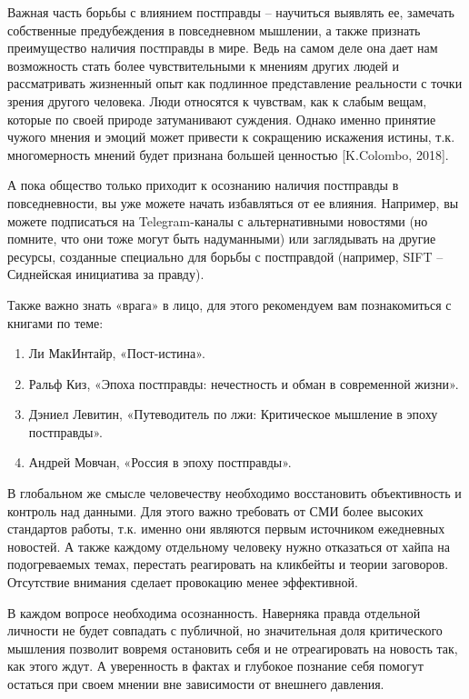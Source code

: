 Важная часть борьбы с влиянием постправды – научиться выявлять ее, замечать собственные предубеждения в повседневном мышлении, а также признать преимущество наличия постправды в мире. Ведь на самом деле она дает нам возможность стать более чувствительными к мнениям других людей и рассматривать жизненный опыт как подлинное представление реальности с точки зрения другого человека. Люди относятся к чувствам, как к слабым вещам, которые по своей природе затуманивают суждения. Однако именно принятие чужого мнения и эмоций может привести к сокращению искажения истины, т.к. многомерность мнений будет признана большей ценностью [K.Colombo, 2018].

А пока общество только приходит к осознанию наличия постправды в повседневности, вы уже можете начать избавляться от ее влияния. Например, вы можете подписаться на Telegram-каналы с альтернативными новостями (но помните, что они тоже могут быть надуманными) или заглядывать на другие ресурсы, созданные специально для борьбы с постправдой (например, SIFT – Сиднейская инициатива за правду).

Также важно знать «врага» в лицо, для этого рекомендуем вам познакомиться с книгами по теме:

\begin{enumerate}
    \item Ли МакИнтайр, «Пост-истина».
    \item Ральф Киз, «Эпоха постправды: нечестность и обман в современной жизни».
    \item Дэниел Левитин, «Путеводитель по лжи: Критическое мышление в эпоху постправды».
    \item Андрей Мовчан, «Россия в эпоху постправды».
\end{enumerate}
В глобальном же смысле человечеству необходимо восстановить объективность и контроль над данными. Для этого важно требовать от СМИ более высоких стандартов работы, т.к. именно они являются первым источником ежедневных новостей. А также каждому отдельному человеку нужно отказаться от хайпа на подогреваемых темах, перестать реагировать на кликбейты и теории заговоров. Отсутствие внимания сделает провокацию менее эффективной.

В каждом вопросе необходима осознанность. Наверняка правда отдельной личности не будет совпадать с публичной, но значительная доля критического мышления позволит вовремя остановить себя и не отреагировать на новость так, как этого ждут. А уверенность в фактах и глубокое познание себя помогут остаться при своем мнении вне зависимости от внешнего давления.

